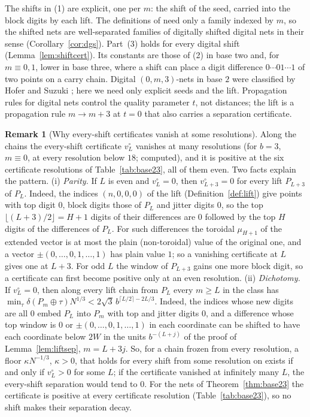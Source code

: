 \documentclass[11pt]{amsart}
\theoremstyle{definition}
\newtheorem{remark}[theorem]{Remark}
\theoremstyle{plain}
\begin{document}
The shifts in (1) are explicit, one per $m$: the shift of the seed, carried into the block digits by each lift. The definitions of \cite{DGS2} need only a family indexed by $m$, so the shifted nets are well-separated families of digitally shifted digital nets in their sense (Corollary~\ref{cor:dgs}). Part~(3) holds for every digital shift (Lemma~\ref{lem:shiftcert}). Its constants are those of (2) in base two and, for $m\equiv0,1$, lower in base three, where a shift can place a digit difference $0\cdots01\cdots1$ of two points on a carry chain. Digital $(0,m,3)$-nets in base $2$ were classified by Hofer and Suzuki \cite{HS19}; here we need only explicit seeds and the lift. Propagation rules for digital nets \cite[Sec.~4.2, 4.4]{DP10} control the quality parameter $t$, not distances; the lift is a propagation rule $m\to m+3$ at $t=0$ that also carries a separation certificate.

\begin{remark}[Why every-shift certificates vanish at some resolutions]\label{rem:shiftparity}
Along the chains the every-shift certificate $v^\circ_L$ vanishes at many resolutions (for $b=3$, $m\equiv0$, at every resolution below $18$; computed), and it is positive at the six certificate resolutions of Table~\ref{tab:base23}, all of them even. Two facts explain the pattern. (i) \emph{Parity.} If $L$ is even and $v^\circ_L=0$, then $v^\circ_{L+3}=0$ for every lift $P_{L+3}$ of $P_L$. Indeed, the indices $(n,0,0,0)$ of the lift (Definition~\ref{def:lift}) give points with top digit $0$, block digits those of $P_L$ and jitter digits $0$, so the top $\lfloor(L+3)/2\rfloor=H+1$ digits of their differences are $0$ followed by the top $H$ digits of the differences of $P_L$. For such differences the toroidal $\mu_{H+1}$ of the extended vector is at most the plain (non-toroidal) value of the original one, and a vector $\pm(0,\dots,0,1,\dots,1)$ has plain value $1$; so a vanishing certificate at $L$ gives one at $L+3$. For odd $L$ the window of $P_{L+3}$ gains one more block digit, so a certificate can first become positive only at an even resolution. (ii) \emph{Dichotomy.} If $v^\circ_L=0$, then along every lift chain from $P_L$ every $m\ge L$ in the class has $\min_\tau\delta(P_m\oplus\tau)N^{1/3}<2\sqrt3\,b^{\lceil L/2\rceil-2L/3}$. Indeed, the indices whose new digits are all $0$ embed $P_L$ into $P_m$ with top and jitter digits $0$, and a difference whose top window is $0$ or $\pm(0,\dots,0,1,\dots,1)$ in each coordinate can be shifted to have each coordinate below $2W$ in the units $b^{-(L+j)}$ of the proof of Lemma~\ref{lem:liftsep}, $m=L+3j$. So, for a chain frozen from every resolution, a floor $\kappa N^{-1/3}$, $\kappa>0$, that holds for every shift from some resolution on exists if and only if $v^\circ_L>0$ for some $L$; if the certificate vanished at infinitely many $L$, the every-shift separation would tend to $0$. For the nets of Theorem~\ref{thm:base23} the certificate is positive at every certificate resolution (Table~\ref{tab:base23}), so no shift makes their separation decay.
\end{remark}
\end{document}
